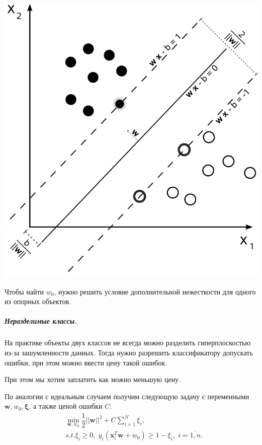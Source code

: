 \documentclass[12pt]{article}
\renewcommand{\geq}{\ensuremath{\geqslant}}
\begin{document}
\begin{center}
	

	\includegraphics[scale=0.5]{hyperplane}

\end{center}
Чтобы найти $w_0$, нужно решить условие дополнительной нежесткости для одного из опорных объектов.


\subparagraph{Неразделимые классы.}
На практике объекты двух классов не всегда можно разделить гиперплоскостью из-за зашумленности данных. Тогда нужно разрешить классификатору допускать ошибки, при этом можно ввести цену такой ошибок.

При этом мы хотим заплатить как можно меньшую цену.

По аналогии с идеальным случаем получим следующую задачу с переменными $\mathbf{w}, w_0, \mathbf{\xi}$, а также ценой ошибки $C$:
\begin{align*}&
\underset{\mathbf{w}, w_0}{\min} \dfrac{1}{2}||\mathbf{w}||^2 + C\sum_{i=1}^N \xi_i,
\\&s.t. \xi_i \geq 0,\; y_i(\mathbf{x}_i^T\mathbf{w} + w_0) \geq 1 - \xi_i, \; i = \overline{1,n}.
\end{align*}
\end{document}
